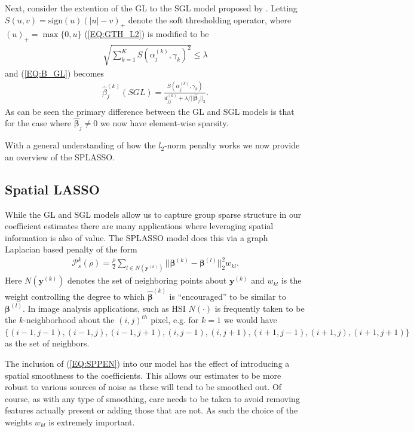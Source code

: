 \documentclass{article}
\numberwithin{equation}{section}
\theoremstyle{plain}
\newcommand{\bs}{\boldsymbol}
\begin{document}
Next, consider the extention of the GL to the SGL model proposed by
\cite{simon2013}. Letting
$S(u, v) = \mbox{sign}(u)(|u| - v)_+$ denote the
soft thresholding operator, where $(u)_+ = \max\{0, u\}$ 
(\ref{EQ:GTH_L2}) is modified to be
\begin{align}
\label{EQ:SGTH_L2}
\sqrt{\sum_{k = 1}^K S(\alpha_j^{(k)}, \gamma_k)^2} \leq \lambda
\end{align}
\noindent and (\ref{EQ:B_GL}) becomes
\begin{align}
\label{EQ:B_SGL}
\hat{\beta}_j^{(k)}(SGL) = \frac{S(\alpha_j^{(k)}, \gamma_k)}{d^{(k)}_{jj} +
\lambda/||\hat{\bs\beta}_j||_2}.
\end{align}
\noindent As can be seen the primary difference between the GL and SGL models is
that for the case where $\hat{\bs\beta}_j \neq 0$ we now have element-wise sparsity. 

With a general understanding of how the $l_2$-norm penalty works we now provide
an overview of the SPLASSO.

\subsection{Spatial LASSO}
\label{SEC:SPLASSO}

While the GL and SGL models allow us to capture group sparse structure in our
coefficient estimates there are many applications where leveraging spatial
information is also of value. The SPLASSO model does this
via a graph Laplacian based penalty of the form
\begin{align}
\label{EQ:SPPEN}
\mathcal{P}_s^{k}(\rho) = \frac{\rho}{2}\sum_{l \in
N(\mathbf{y}^{(k)})} ||\bs\beta^{(k)} - \bs\beta^{(l)}||_2^2 w_{kl}.
\end{align}
\noindent Here $N(\mathbf{y}^{(k)})$ denotes the set of
neighboring points about $\mathbf{y}^{(k)}$ and $w_{kl}$ is the weight
controlling the degree to which $\hat{\bs\beta}^{(k)}$ is ``encouraged'' to be
similar to $\bs\beta^{(l)}$. 
In image analysis applications, such as HSI $N(\cdot)$ is frequently
taken to be the $k$-neighborhood about the $(i,j)^{th}$ pixel, e.g. for $k = 1$
we would have $\{ (i-1,j-1), (i-1,j), (i-1,j+1), (i,j-1), (i,j+1), (i+1,j-1), (i+1,j),
(i+1,j+1)\}$ as the set of neighbors. 


The inclusion of (\ref{EQ:SPPEN}) into our model has the effect of introducing a
spatial smoothness to the coefficients. This allows our estimates to be
more robust to various sources of noise as these will tend to be smoothed out.
Of course, as with any type of smoothing, care needs to be taken to avoid
removing features actually present or adding those that are not. As such the
choice of the weights $w_{kl}$ is extremely important. 
\end{document}

